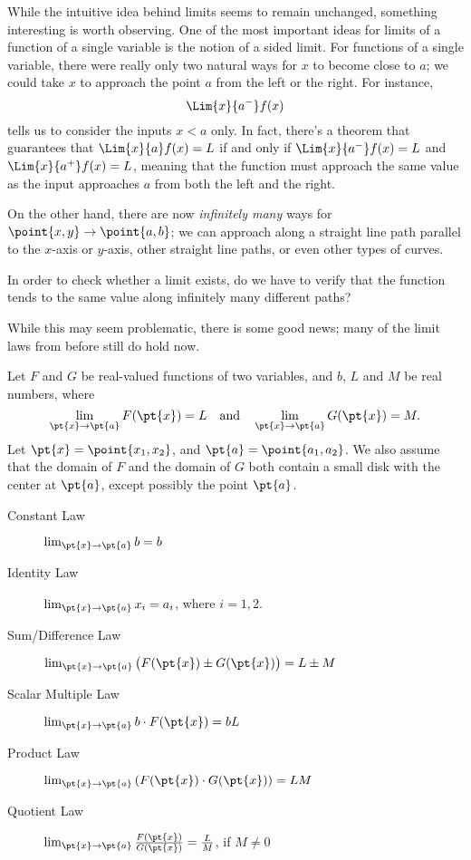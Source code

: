 \documentclass{ximera}
\begin{document}
While the intuitive idea behind limits seems to remain unchanged, something interesting is worth observing.  One of the most important ideas for limits of a function of a single variable is the notion of a sided limit.  For functions of a single variable, there were really only two natural ways for $x$ to become close to $a$; we could take $x$ to approach the point $a$ from the left or the right.  For instance,
\[
\Lim{x}{a^-}f(x) 
\]
tells us to consider the inputs $x<a$ only.  In fact, there's a theorem that guarantees that $\Lim{x}{a} f(x) = L$ if and only if $\Lim{x}{a^-}f(x) =L$ and $\Lim{x}{a^+}f(x) =L$, meaning that the function must approach the same value as the input approaches $a$ from both the left and the right.

On the other hand, there are now \emph{infinitely many} ways for $\point{x,y} \to \point{a,b}$; we can approach along a straight line path parallel to the $x$-axis or $y$-axis, other straight line paths, or even other types of curves.  


In order to check whether a limit exists, do we have to verify that the function tends to the same value along infinitely many different paths?

  While this may seem problematic, there is some good news; many of the limit laws from before still do hold now.

\begin{theorem}
  Let $F$ and $G$ be real-valued functions of two
  variables, and $b$, $L$ and $M$ be real numbers, where
  \[
  \lim_{\pt{x}\to\pt{a}}F(\pt{x}) = L \quad \text{and}\quad \lim_{\pt{x}\to\pt{a}} G(\pt{x}) = M.
  \]
Let $\pt{x} = \point{x_{1},x_{2}}$, and $\pt{a} = \point{a_{1},a_{2}}$. We  also assume that  the domain of $F$ and the domain of $G$
 both  contain a small disk with the center at $\pt{a}$, except possibly the point $\pt{a}$.
\begin{description}
\item[Constant Law] $\lim_{\pt{x}\to \pt{a}} b = b$
\item[Identity Law] $\lim_{\pt{x}\to \pt{a}} x_i = a_i$, where $i=1,2.$
\item[Sum/Difference Law] $\lim_{\pt{x}\to \pt{a}}\big(F(\pt{x})\pm G(\pt{x})\big) = L\pm M$
\item[Scalar Multiple Law] $\lim_{\pt{x}\to \pt{a}} b\cdot F(\pt{x}) = bL$
\item[Product Law] $\lim_{\pt{x}\to \pt{a}} \left(F(\pt{x})\cdot G(\pt{x})\right) = LM$
\item[Quotient Law] $\lim_{\pt{x}\to \pt{a}} \frac{F(\pt{x})}{G(\pt{x})} = \frac{L}{M}$, if $M\neq 0$
\end{description}
\end{theorem}
\end{document}
